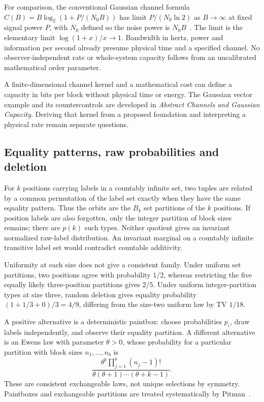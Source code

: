 For comparison, the conventional Gaussian channel formula
$C(B)=B\log_2(1+P/(N_0B))$ has limit $P/(N_0\ln2)$ as $B\to\infty$ at fixed signal power $P$, with $N_0$ defined so the noise power is $N_0B$~\cite{shannon}. The limit is the elementary limit $\log(1+x)/x\to1$. Bandwidth in hertz, power and information per second already presume physical time and a specified channel. No observer-independent rate or whole-system capacity follows from an uncalibrated mathematical order parameter.

A finite-dimensional channel kernel and a mathematical cost can define a capacity in bits per block without physical time or energy. The Gaussian vector example and its countercontrols are developed in \emph{Abstract Channels and Gaussian Capacity}. Deriving that kernel from a proposed foundation and interpreting a physical rate remain separate questions.

\subsection{Equality patterns, raw probabilities and deletion}
\label{pat:orbits}
For $k$ positions carrying labels in a countably infinite set, two tuples are related by a common permutation of the label set exactly when they have the same equality pattern. Thus the orbits are the $B_k$ set partitions of the $k$ positions. If position labels are also forgotten, only the integer partition of block sizes remains; there are $p(k)$ such types. Neither quotient gives an invariant normalized raw-label distribution. An invariant marginal on a countably infinite transitive label set would contradict countable additivity.

Uniformity at each size does not give a consistent family. Under uniform set partitions, two positions agree with probability $1/2$, whereas restricting the five equally likely three-position partitions gives $2/5$. Under uniform integer-partition types at size three, random deletion gives equality probability $(1+1/3+0)/3=4/9$, differing from the size-two uniform law by TV $1/18$.

A positive alternative is a deterministic paintbox: choose probabilities $p_i$, draw labels independently, and observe their equality partition. A different alternative is an Ewens law with parameter $\theta>0$, whose probability for a particular partition with block sizes $n_1,\ldots,n_b$ is
\[
 \frac{\theta^b\prod_{j=1}^b(n_j-1)!}{\theta(\theta+1)\cdots(\theta+k-1)}.
\]
These are consistent exchangeable laws, not unique selections by symmetry. Paintboxes and exchangeable partitions are treated systematically by Pitman~\cite{pitman}.


